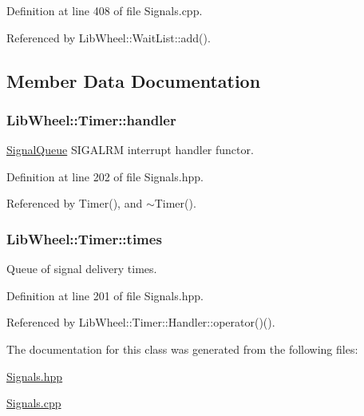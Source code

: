\-Definition at line 408 of file \-Signals.\-cpp.



\-Referenced by \-Lib\-Wheel\-::\-Wait\-List\-::add().



\subsection{\-Member \-Data \-Documentation}
\hypertarget{classLibWheel_1_1Timer_a0091ca33fd5f8dae22594e39525ef5bc}{
\subsubsection[{handler}]{ {\bf \-Lib\-Wheel\-::\-Timer\-::handler}}}
\label{classLibWheel_1_1Timer_a0091ca33fd5f8dae22594e39525ef5bc}


\hyperlink{classLibWheel_1_1SignalQueue}{\-Signal\-Queue} \-S\-I\-G\-A\-L\-R\-M interrupt handler functor. 



\-Definition at line 202 of file \-Signals.\-hpp.



\-Referenced by \-Timer(), and $\sim$\-Timer().

\hypertarget{classLibWheel_1_1Timer_a5c5886cc2443434a20b1bd4a41ede304}{
\subsubsection[{times}]{ {\bf \-Lib\-Wheel\-::\-Timer\-::times}}}
\label{classLibWheel_1_1Timer_a5c5886cc2443434a20b1bd4a41ede304}


\-Queue of signal delivery times. 



\-Definition at line 201 of file \-Signals.\-hpp.



\-Referenced by \-Lib\-Wheel\-::\-Timer\-::\-Handler\-::operator()().



\-The documentation for this class was generated from the following files\-:\begin{DoxyCompactItemize}
\item 
\hyperlink{Signals_8hpp}{\-Signals.\-hpp}\item 
\hyperlink{Signals_8cpp}{\-Signals.\-cpp}\end{DoxyCompactItemize}
